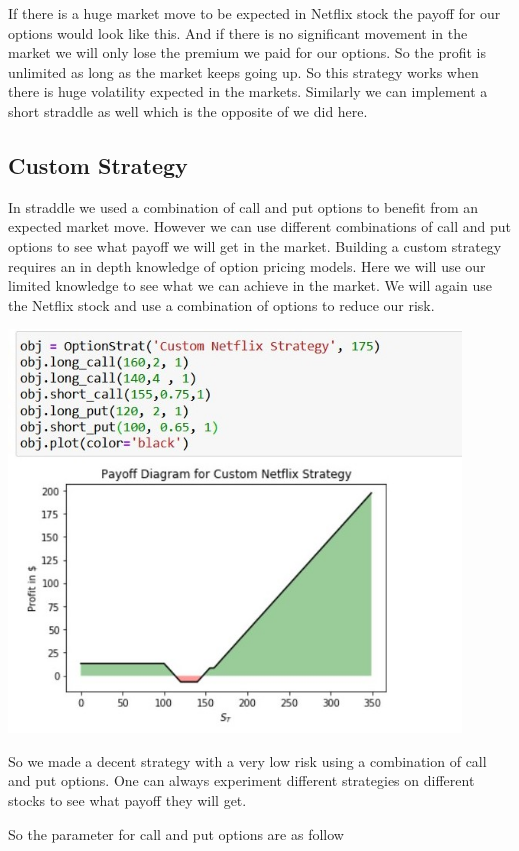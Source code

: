 \documentclass[12pt]{article}
\begin{document}
	If there is a huge market move to be expected in Netflix stock the payoff for our options would look like this. And if there is no significant movement in the market we will only lose the premium we paid for our options. So the profit is unlimited as long as the market keeps going up. So this strategy works when there is huge volatility expected in the markets. Similarly we can implement a short straddle as well which is the opposite of we did here.
	
	\subsection{Custom Strategy}
	In straddle we used a combination of call and put options to benefit from an expected market move. However we can use different combinations of call and put options to see what payoff we will get in the market. Building a custom strategy requires an in depth knowledge of option pricing models. Here we will use our limited knowledge to see what we can achieve in the market. We will again use the Netflix stock and use a combination of options to reduce our risk.
	
	\includegraphics[width=12cm]{Custom}
	
	So we made a decent strategy with a very low risk using a combination of call and put options. One can always experiment different strategies on different stocks to see what payoff they will get. 
	
	So the parameter for call and put options are as follow
	
\end{document}
